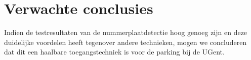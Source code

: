 \section{Verwachte conclusies}
\label{sec:verwachte_conclusies}

Indien de testresultaten van de nummerplaatdetectie hoog genoeg zijn en deze duidelijke voordelen heeft tegenover andere technieken, mogen we concluderen dat dit een haalbare toegangstechniek is voor de parking bij de UGent.
